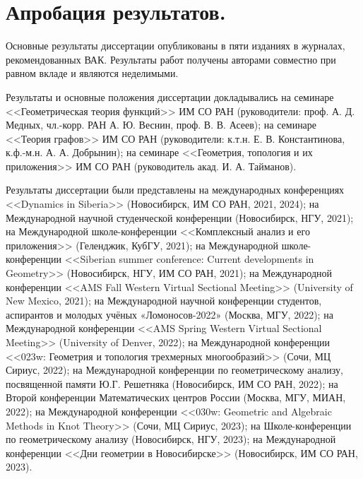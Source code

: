 \section{Апробация результатов.}

Основные результаты диссертации опубликованы в пяти изданиях \cite{DST2021, DST2022, TD2022fs, TD2023fs, VDT2020} в журналах, рекомендованных ВАК.
Результаты работ \cite{DST2021, DST2022, TD2022fs, TD2023fs, VDT2020} получены авторами совместно при равном вкладе и являются неделимыми.

Результаты и основные положения диссертации докладывались на семинаре <<Геометрическая теория функций>> ИМ СО РАН (руководители:
проф. А. Д. Медных, чл.-корр. РАН А. Ю. Веснин, проф. В. В. Асеев); на семинаре <<Теория графов>> ИМ СО РАН (руководители: к.т.н. Е. В. Константинова, к.ф.-м.н. А. А. Добрынин); на семинаре <<Геометрия, топология и их приложения>> ИМ СО РАН (руководитель акад. И. А. Тайманов).

Результаты диссертации были представлены на международных конференциях <<Dynamics in Siberia>> (Новосибирск, ИМ СО РАН, 2021, 2024); 
на Международной научной студенческой конференции (Новосибирск, НГУ, 2021);
на Международной школе-конференции <<Комплексный анализ и его приложения>> (Геленджик, КубГУ, 2021); 
на Международной школе-конференции <<Siberian summer conference: Current developments in Geometry>> (Новосибирск, НГУ, ИМ СО РАН, 2021); 
на Международной конференции <<AMS Fall Western Virtual Sectional Meeting>> (University of New Mexico, 2021); 
на Международной научной конференции студентов, аспирантов и молодых учёных «Ломоносов-2022» (Москва, МГУ, 2022); 
на Международной конференции <<AMS Spring Western Virtual Sectional Meeting>> (University of Denver, 2022); 
на Международной конференции <<023w: Геометрия и топология трехмерных многообразий>> (Сочи, МЦ Сириус, 2022); 
на Международной конференции по геометрическому анализу, посвященной памяти Ю.Г. Решетняка (Новосибирск, ИМ СО РАН, 2022); 
на Второй конференции Математических центров России (Москва, МГУ, МИАН, 2022); 
на Международной конференции <<030w: Geometric and Algebraic Methods in Knot Theory>> (Сочи, МЦ Сириус, 2023);
на Школе-конференции по геометрическому анализу
(Новосибирск, НГУ, 2023);
на Международной конференции <<Дни геометрии в Новосибирске>> (Новосибирск, ИМ СО РАН, 2023).




